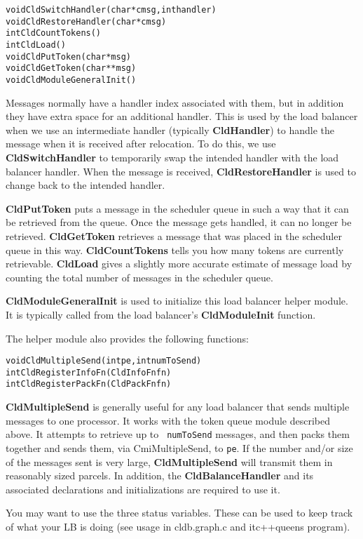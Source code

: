 \begin{alltt}
void CldSwitchHandler(char *cmsg, int handler)
void CldRestoreHandler(char *cmsg)
int CldCountTokens()
int CldLoad()
void CldPutToken(char *msg)
void CldGetToken(char **msg)
void CldModuleGeneralInit()
\end{alltt}

Messages normally have a handler index associated with them, but in addition
they have extra space for an additional handler.  This is used by the
load balancer when we use an intermediate handler (typically {\bf
CldHandler}) to handle the message when it is received after
relocation.  To do this, we use {\bf CldSwitchHandler} to temporarily
swap the intended handler with the load balancer handler.  When the
message is received, {\bf CldRestoreHandler} is used to change back to
the intended handler. 

{\bf CldPutToken} puts a message in the scheduler queue in such a way
that it can be retrieved from the queue. Once the message gets
handled, it can no longer be retrieved.  {\bf CldGetToken} retrieves a
message that was placed in the scheduler queue in this way.
{\bf CldCountTokens} tells you how many tokens are currently
retrievable. {\bf CldLoad} gives a slightly more accurate estimate of
message load by counting the total number of messages in the
scheduler queue.

{\bf CldModuleGeneralInit} is used to initialize this load balancer
helper module.  It is typically called from the load balancer's {\bf
CldModuleInit} function.

The helper module also provides the following functions:

\begin{alltt}
void CldMultipleSend(int pe, int numToSend)
int CldRegisterInfoFn(CldInfoFn fn)
int CldRegisterPackFn(CldPackFn fn)
\end{alltt}

{\bf CldMultipleSend} is generally useful for any load balancer that
sends multiple messages to one processor.  It works with the token
queue module described above.  It attempts to retrieve up to {\tt
numToSend} messages, and then packs them together and sends them, via
CmiMultipleSend, to {\tt pe}.  If the number and/or size of the
messages sent is very large, {\bf CldMultipleSend} will transmit them
in reasonably sized parcels.  In addition, the {\bf CldBalanceHandler} and
its associated declarations and initializations are required to use it.

You may want to use the three status variables.  These can be used to
keep track of what your LB is doing (see usage in cldb.graph.c and
itc++queens program).

